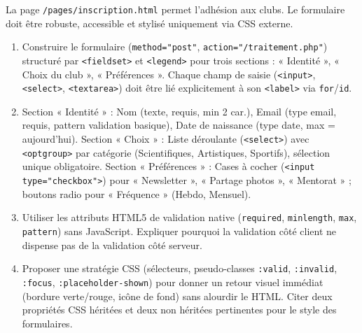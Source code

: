 \documentclass[11pt]{article}
\begin{document}
\begin{exercice}
La page \texttt{/pages/inscription.html} permet l'adhésion aux clubs. Le formulaire doit être robuste, accessible et stylisé uniquement via CSS externe.

\begin{enumerate}
    \item Construire le formulaire (\texttt{method="post"}, \texttt{action="/traitement.php"}) structuré par \texttt{<fieldset>} et \texttt{<legend>} pour trois sections : « Identité », « Choix du club », « Préférences ». Chaque champ de saisie (\texttt{<input>}, \texttt{<select>}, \texttt{<textarea>}) doit être lié explicitement à son \texttt{<label>} via \texttt{for}/\texttt{id}.
    \item Section « Identité » : Nom (texte, requis, min 2 car.), Email (type email, requis, pattern validation basique), Date de naissance (type date, max = aujourd'hui). Section « Choix » : Liste déroulante (\texttt{<select>}) avec \texttt{<optgroup>} par catégorie (Scientifiques, Artistiques, Sportifs), sélection unique obligatoire. Section « Préférences » : Cases à cocher (\texttt{<input type="checkbox">}) pour « Newsletter », « Partage photos », « Mentorat » ; boutons radio pour « Fréquence » (Hebdo, Mensuel).
    \item Utiliser les attributs HTML5 de validation native (\texttt{required}, \texttt{minlength}, \texttt{max}, \texttt{pattern}) sans JavaScript. Expliquer pourquoi la validation côté client ne dispense pas de la validation côté serveur.
    \item Proposer une stratégie CSS (sélecteurs, pseudo-classes \texttt{:valid}, \texttt{:invalid}, \texttt{:focus}, \texttt{:placeholder-shown}) pour donner un retour visuel immédiat (bordure verte/rouge, icône de fond) sans alourdir le HTML. Citer deux propriétés CSS héritées et deux non héritées pertinentes pour le style des formulaires.
\end{enumerate}
\end{exercice}
\end{document}

